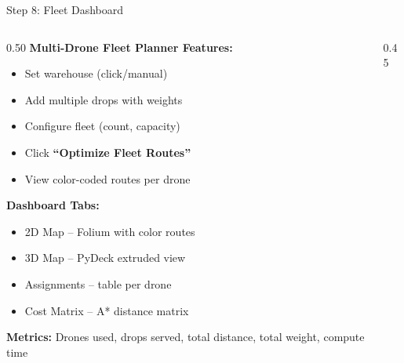 \documentclass[aspectratio=169, 11pt]{beamer}
\begin{document}
\begin{frame}{Step 8: Fleet Dashboard}
\begin{columns}[T]
\begin{column}{0.50\textwidth}
\textcolor{neongreen}{\textbf{Multi-Drone Fleet Planner Features:}}\\[0.2cm]
\small
\begin{itemize}
    \item[\textcolor{neongreen}{1.}] Set warehouse (click/manual)
    \item[\textcolor{neongreen}{2.}] Add multiple drops with weights
    \item[\textcolor{neongreen}{3.}] Configure fleet (count, capacity)
    \item[\textcolor{neongreen}{4.}] Click \textbf{``Optimize Fleet Routes''}
    \item[\textcolor{neongreen}{5.}] View color-coded routes per drone
\end{itemize}

\vspace{0.2cm}
\textcolor{accentblue}{\textbf{Dashboard Tabs:}}
\begin{itemize}\small
    \item 2D Map -- Folium with color routes
    \item 3D Map -- PyDeck extruded view
    \item Assignments -- table per drone
    \item Cost Matrix -- A* distance matrix
\end{itemize}

\vspace{0.2cm}
\textcolor{warnorange}{\textbf{Metrics:}} Drones used, drops served, total distance, total weight, compute time
\end{column}
\begin{column}{0.45\textwidth}
\end{column}
\end{columns}
\end{frame}
\end{document}
